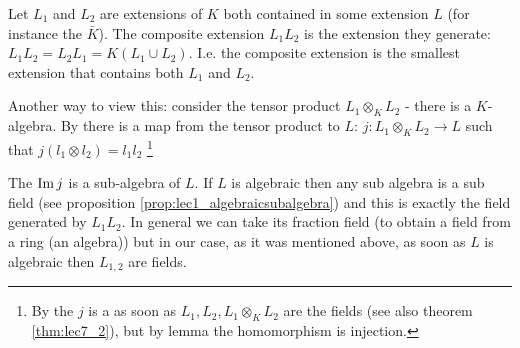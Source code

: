 \begin{definition}
  Let $L_1$ and $L_2$ are extensions of $K$ both contained in some
  extension $L$ (for instance the 
  $\bar{K}$). The composite extension $L_1 L_2$ is the extension they
  generate: $L_1 L_2 = L_2 L_1 = K\left(L_1 \cup L_2\right)$. I.e. the
  composite extension is the smallest extension that contains both
  $L_1$ and $L_2$.
  \label{def:compositeextension}
\end{definition}

Another way to view this: consider the tensor product $L_1 \otimes_K
L_2$ - there is a $K$-algebra. By 
there is a map from the tensor product to $L$:
\(
j: L_1 \otimes_K L_2 \to L  
\)
such that $j\left(l_1 \otimes l_2\right) = l_1 l_2$
\footnote{
  By the  $j$ is a 
   as soon as
  $L_1, L_2, L_1 \otimes_K L_2$ are the fields (see also theorem
  \ref{thm:lec7_2}), but by lemma 
   the homomorphism is
  injection.
}


The 
 $\operatorname{Im} j$ is a sub-algebra of $L$. If $L$ is
algebraic then any sub algebra is a sub field (see proposition
\ref{prop:lec1_algebraicsubalgebra}) and this 
is exactly the field generated by $L_1 L_2$. In general we can take
its fraction field (to obtain a field from a ring (an algebra)) but in
our case, as it was mentioned above, as soon as $L$ is algebraic then
$L_{1,2}$ are fields.


